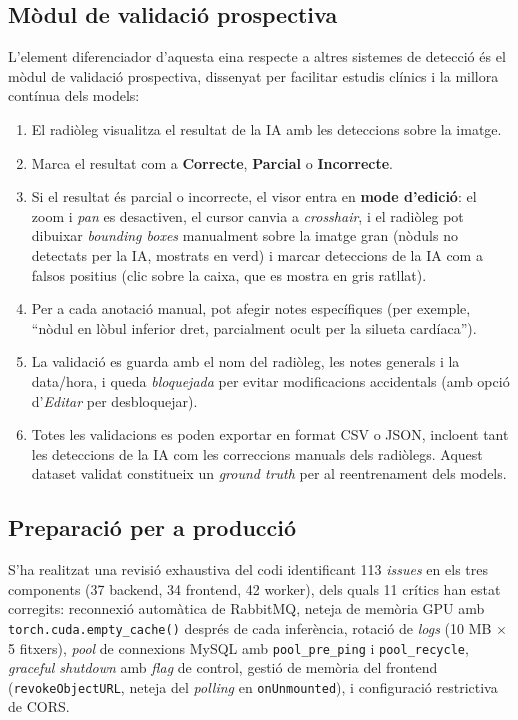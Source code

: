 \documentclass[conference]{IEEEtran}
\begin{document}
\subsection{Mòdul de validació prospectiva}

L'element diferenciador d'aquesta eina respecte a altres sistemes de detecció és el mòdul de validació prospectiva, dissenyat per facilitar estudis clínics i la millora contínua dels models:

\begin{enumerate}
    \item El radiòleg visualitza el resultat de la IA amb les deteccions sobre la imatge.
    \item Marca el resultat com a \textbf{Correcte}, \textbf{Parcial} o \textbf{Incorrecte}.
    \item Si el resultat és parcial o incorrecte, el visor entra en \textbf{mode d'edició}: el zoom i \textit{pan} es desactiven, el cursor canvia a \textit{crosshair}, i el radiòleg pot dibuixar \textit{bounding boxes} manualment sobre la imatge gran (nòduls no detectats per la IA, mostrats en verd) i marcar deteccions de la IA com a falsos positius (clic sobre la caixa, que es mostra en gris ratllat).
    \item Per a cada anotació manual, pot afegir notes específiques (per exemple, ``nòdul en lòbul inferior dret, parcialment ocult per la silueta cardíaca'').
    \item La validació es guarda amb el nom del radiòleg, les notes generals i la data/hora, i queda \textit{bloquejada} per evitar modificacions accidentals (amb opció d'\textit{Editar} per desbloquejar).
    \item Totes les validacions es poden exportar en format CSV o JSON, incloent tant les deteccions de la IA com les correccions manuals dels radiòlegs. Aquest dataset validat constitueix un \textit{ground truth} per al reentrenament dels models.
\end{enumerate}

\subsection{Preparació per a producció}

S'ha realitzat una revisió exhaustiva del codi identificant 113 \textit{issues} en els tres components (37 backend, 34 frontend, 42 worker), dels quals 11 crítics han estat corregits: reconnexió automàtica de RabbitMQ, neteja de memòria GPU amb \texttt{torch.cuda.empty\_cache()} després de cada inferència, rotació de \textit{logs} (10 MB $\times$ 5 fitxers), \textit{pool} de connexions MySQL amb \texttt{pool\_pre\_ping} i \texttt{pool\_recycle}, \textit{graceful shutdown} amb \textit{flag} de control, gestió de memòria del frontend (\texttt{revokeObjectURL}, neteja del \textit{polling} en \texttt{onUnmounted}), i configuració restrictiva de CORS.
\end{document}
